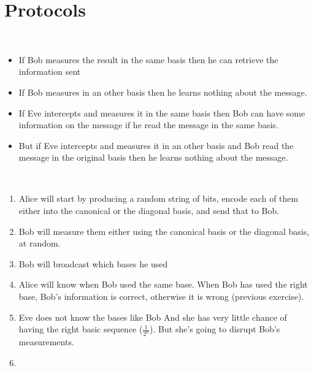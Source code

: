 \section{Protocols}

~

\begin{itemize}
  \item If Bob measures the result in the same basis then he can retrieve the
    information sent

  \item If Bob measures in an other basis then he learns nothing about the
    message.

  \item If Eve intercepts and measures it in the same basis then Bob can have
    some information on the message if he read the message in the same basis.

  \item But if Eve intercepts and measures it in an other basis and Bob read the
    message in the original basis then he learns nothing about the message.
\end{itemize}

\exo[BB84]~

\begin{enumerate}
  \item Alice will start by producing a random string of bits, encode each of
    them either into the canonical or the diagonal basis, and send that to Bob.

  \item Bob will measure them either using the canonical basis or the
    diagonal basis, at random.

  \item Bob will broadcast which bases he used

  \item Alice will know when Bob used the same base. When Bob has used the right
    base, Bob's information is correct, otherwise it is wrong (previous exercise).

  \item Eve does not know the bases like Bob And she has very little chance of
    having the right basic sequence ($\frac{1}{2^n}$). But she's going to
    disrupt Bob's measurements.

  \item
\end{enumerate}

~

